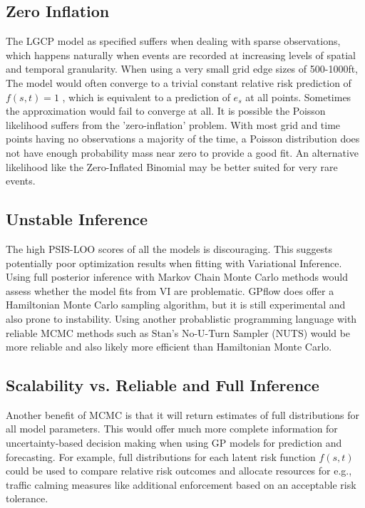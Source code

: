 \subsection{Zero Inflation}


The LGCP model as specified suffers when dealing with  sparse observations, which happens naturally when events are recorded at increasing levels of spatial and temporal granularity. When using a very small grid edge sizes of 500-1000ft, The model would often converge to a trivial constant relative risk prediction of $f(s,t)=1$ , which is equivalent to a prediction of $e_s$ at all points. Sometimes the approximation would fail to converge at all. It is possible the Poisson likelihood suffers from the 'zero-inflation' problem. With most grid and time points having no observations a majority of the time, a Poisson distribution does not have enough probability mass near zero to provide a good fit. An alternative likelihood like the Zero-Inflated Binomial may be better suited for very rare events. \par

\subsection{Unstable Inference}

The high PSIS-LOO scores of all the models is discouraging. This suggests potentially poor optimization results when fitting with Variational Inference. Using full posterior inference with Markov Chain Monte Carlo methods would assess whether the model fits from VI are problematic. GPflow does offer a Hamiltonian Monte Carlo sampling algorithm, but it is still experimental and also prone to instability. Using another probablistic programming language with reliable MCMC methods such as Stan's No-U-Turn Sampler (NUTS) would be more reliable and also likely more efficient than Hamiltonian Monte Carlo.


\subsection{Scalability vs. Reliable and Full Inference}

Another benefit of MCMC is that it will return estimates of full distributions for all model parameters. This would offer much more complete information for uncertainty-based decision making when using GP models for prediction and forecasting. For example, full distributions for each latent risk function $f(s,t)$ could be used to compare relative risk outcomes and allocate resources for e.g., traffic calming measures like additional enforcement based on an acceptable risk tolerance. \par

